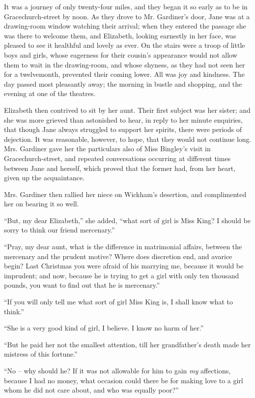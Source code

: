 It was a journey of only twenty-four miles, and they
began it so early as to be in Gracechurch-street by noon.
As they drove to Mr. Gardiner’s door, Jane was at a
drawing-room window watching their arrival; when they
entered the passage she was there to welcome them, and
Elizabeth, looking earnestly in her face, was pleased to see
it healthful and lovely as ever. On the stairs were a troop of
little boys and girls, whose eagerness for their cousin’s
appearance would not allow them to wait in the drawing-room,
and whose shyness, as they had not seen her for a
twelvemonth, prevented their coming lower. All was joy
and kindness. The day passed most pleasantly away;
the morning in bustle and shopping, and the evening at
one of the theatres.

Elizabeth then contrived to sit by her aunt. Their
first subject was her sister; and she was more grieved
than astonished to hear, in reply to her minute enquiries,
that though Jane always struggled to support her spirits,
there were periods of dejection. It was reasonable, however,
to hope, that they would not continue long. Mrs.
Gardiner gave her the particulars also of Miss Bingley’s
visit in Gracechurch-street, and repeated conversations
occurring at different times between Jane and herself,
which proved that the former had, from her heart, given
up the acquaintance.

Mrs. Gardiner then rallied her niece on Wickham’s
desertion, and complimented her on bearing it so well.

“But, my dear Elizabeth,” she added, “what sort of
girl is Miss King? I should be sorry to think our friend
mercenary.”

“Pray, my dear aunt, what is the difference in matrimonial
affairs, between the mercenary and the prudent
motive? Where does discretion end, and avarice begin?
Last Christmas you were afraid of his marrying me,
because it would be imprudent; and now, because he is
trying to get a girl with only ten thousand pounds, you
want to find out that he is mercenary.”

“If you will only tell me what sort of girl Miss King is,
I shall know what to think.”

“She is a very good kind of girl, I believe. I know no
harm of her.”

“But he paid her not the smallest attention, till her
grandfather’s death made her mistress of this fortune.”

“No -- why should he? If it was not allowable for
him to gain \textit{my} affections, because I had no money, what
occasion could there be for making love to a girl whom
he did not care about, and who was equally poor?”

